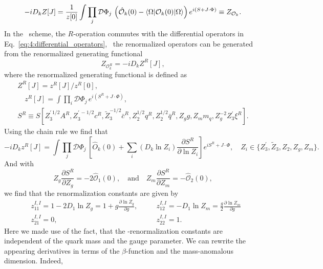 \begin{equation}
-i D_k Z[J] = \frac{1}{z[0]}\int \prod_j \mathcal{D} \Phi_j \, \left(\hat{\mathcal{O}}_k(0) - \braket{\Omega | \mathcal{O}_k(0) |\Omega} \right) e^{i (S + J \cdot \Phi)} \equiv Z_{\mathcal{O}_k}.
\end{equation}
In the \MS\ scheme, the $R$-operation commutes with the differential operators in Eq.~\eqref{eq:4:differential_operators}, \ie\ the renormalized operators can be generated from the renormalized generating functional
\begin{equation}
Z_{\mathcal{O}_k^R} = -i D_k Z^R[J],
\end{equation}
where the renormalized generating functional is defined as
\begin{equation}
\begin{gathered}
Z^R[J] = z^R[J]/z^R[0] ,\\
\quad z^R[J] = \int \prod_i \mathcal{D}\Phi_j \, e^{i(S^R + J \cdot \Phi)}, \\
S^R \equiv S[Z_3^{\prime\, 1/2} A^R, Z_3^{\prime\, -1/2} c^R, \tilde{Z}_3^{-1/2}\bar{c}^R, Z_2^{1/2} q^R, Z_2^{1/2} \bar{q}^R, Z_g g, Z_m m_q, Z_g^{-2} Z_3^\prime \xi^R].
\end{gathered}
\end{equation}
Using the chain rule we find that
\begin{equation}
-i D_k z^R[J] = \int \prod_j \mathcal{D} \Phi_j \, \left[ \hat{O}_k(0) + \sum_i (D_k \ln Z_i)  \frac{\partial S^R}{\partial \ln Z_i}\right] e^{i S^R + J \cdot \Phi}, \quad Z_i \in \big \lbrace Z_3^\prime , \tilde{Z}_3, Z_2, Z_g, Z_m \big \rbrace.
\end{equation}
And with
\begin{equation}
Z_g \frac{\partial S^R}{\partial Z_g} = - 2 \hat{\mathcal{O}}_1(0), \quad \text{and} \quad Z_m \frac{\partial S^R}{\partial Z_m} = - \hat{\mathcal{O}}_2(0),
\end{equation}
we find that the renormalization constants are given by
\begin{equation}
\begin{alignedat}{2}
&z^{I,I}_{11} = 1 - 2 D_1 \ln Z_g = 1 + g\frac{\partial \ln Z_g}{\partial g}, \quad &&z^{I,I}_{12} = - D_1 \ln Z_m = \frac{g}{2} \frac{\partial \ln Z_m}{\partial g} \\
&z^{I,I}_{21} = 0, \quad &&z^{I,I}_{22} = 1.
\end{alignedat}
\label{eq:4:renormalization_matrix_coefficients}
\end{equation}
Here we made use of the fact, that the \MS-renormalization constants are independent of the quark mass and the gauge parameter. We can rewrite the appearing derivatives in terms of the $\beta$-function and the mass-anomalous dimension. Indeed,

